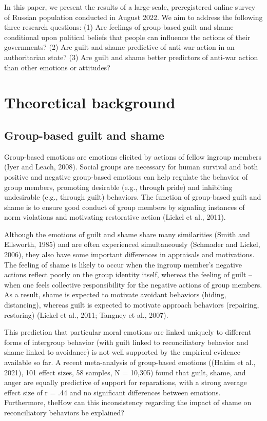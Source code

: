\documentclass[
]{article}
\begin{document}
In this paper, we present the results of a large-scale, preregistered online survey of Russian population conducted in August 2022. We aim to address the following three research questions: (1) Are feelings of group-based guilt and shame conditional upon political beliefs that people can influence the actions of their governments? (2) Are guilt and shame predictive of anti-war action in an authoritarian state? (3) Are guilt and shame better predictors of anti-war action than other emotions or attitudes?

\section*{Theoretical background}\label{theoretical-background}

\allsectionsfont{\raggedright}

\subsection*{Group-based guilt and shame}\label{group-based-guilt-and-shame}

Group-based emotions are emotions elicited by actions of fellow ingroup members (Iyer and Leach, 2008). Social groups are necessary for human survival and both positive and negative group-based emotions can help regulate the behavior of group members, promoting desirable (e.g., through pride) and inhibiting undesirable (e.g., through guilt) behaviors. The function of group-based guilt and shame is to ensure good conduct of group members by signaling instances of norm violations and motivating restorative action (Lickel et al., 2011).

Although the emotions of guilt and shame share many similarities (Smith and Ellsworth, 1985) and are often experienced simultaneously (Schmader and Lickel, 2006), they also have some important differences in appraisals and motivations. The feeling of shame is likely to occur when the ingroup member's negative actions reflect poorly on the group identity itself, whereas the feeling of guilt -- when one feels collective responsibility for the negative actions of group members. As a result, shame is expected to motivate avoidant behaviors (hiding, distancing), whereas guilt is expected to motivate approach behaviors (repairing, restoring) (Lickel et al., 2011; Tangney et al., 2007).

This prediction that particular moral emotions are linked uniquely to different forms of intergroup behavior (with guilt linked to reconciliatory behavior and shame linked to avoidance) is not well supported by the empirical evidence available so far. A recent meta-analysis of group-based emotions ((Hakim et al., 2021), 101 effect sizes, 58 samples, N = 10,305) found that guilt, shame, and anger are equally predictive of support for reparations, with a strong average effect size of r = .44 and no significant differences between emotions. Furthermore, theHow can this inconsistency regarding the impact of shame on reconciliatory behaviors be explained?
\end{document}
